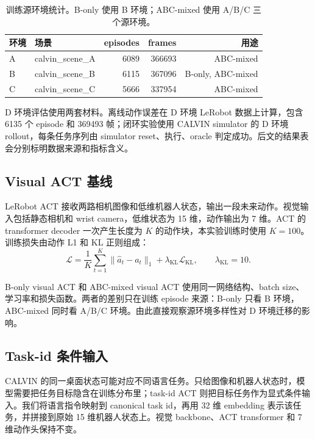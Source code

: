 \documentclass[11pt,a4paper,fontset=fandol]{ctexart}
\begin{document}
\begin{table}[!htbp]
\centering
\small
\caption{训练源环境统计。B-only 使用 B 环境；ABC-mixed 使用 A/B/C 三个源环境。}
\label{tab:data_split_v2}
\begin{tabular}{llrrr}
\toprule
环境 & 场景 & episodes & frames & 用途 \\
\midrule
A & calvin\_scene\_A & 6089 & 366693 & ABC-mixed \\
B & calvin\_scene\_B & 6115 & 367096 & B-only, ABC-mixed \\
C & calvin\_scene\_C & 5666 & 337954 & ABC-mixed \\
\bottomrule
\end{tabular}
\end{table}

D 环境评估使用两套材料。离线动作误差在 D 环境 LeRobot 数据上计算，包含 6135 个 episode 和 369493 帧；闭环实验使用 CALVIN simulator 的 D 环境 rollout，每条任务序列由 simulator reset、执行、oracle 判定成功。后文的结果表会分别标明数据来源和指标含义。

\subsection{Visual ACT 基线}

LeRobot ACT 接收两路相机图像和低维机器人状态，输出一段未来动作。视觉输入包括静态相机和 wrist camera，低维状态为 15 维，动作输出为 7 维。ACT 的 transformer decoder 一次产生长度为 $K$ 的动作块，本实验训练时使用 $K=100$。训练损失由动作 L1 和 KL 正则组成：
\begin{equation}
  \mathcal{L}=\frac{1}{K}\sum_{t=1}^{K}\lVert \hat{a}_t-a_t\rVert_1+\lambda_{\mathrm{KL}}\mathcal{L}_{\mathrm{KL}},
  \qquad \lambda_{\mathrm{KL}}=10.
\end{equation}

B-only visual ACT 和 ABC-mixed visual ACT 使用同一网络结构、batch size、学习率和损失函数。两者的差别只在训练 episode 来源：B-only 只看 B 环境，ABC-mixed 同时看 A/B/C 环境。由此直接观察源环境多样性对 D 环境迁移的影响。

\subsection{Task-id 条件输入}

CALVIN 的同一桌面状态可能对应不同语言任务。只给图像和机器人状态时，模型需要把任务目标隐含在训练分布里；task-id ACT 则把目标任务作为显式条件输入。我们将语言指令映射到 canonical task id，再用 32 维 embedding 表示该任务，并拼接到原始 15 维机器人状态上。视觉 backbone、ACT transformer 和 7 维动作头保持不变。
\end{document}
